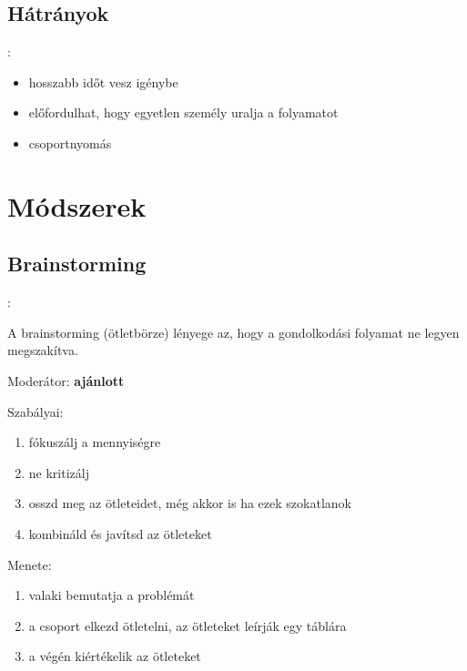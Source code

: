 \documentclass{beamer}
\begin{document}
\subsection{Hátrányok}
\begin{frame}{\secname : \subsecname}
    \begin{itemize}
        \item hosszabb időt vesz igénybe
        \item előfordulhat, hogy egyetlen személy uralja a folyamatot
        \item csoportnyomás
    \end{itemize}
\end{frame}


\section{Módszerek}

\subsection{Brainstorming}
\begin{frame}{\secname : \subsecname}

A brainstorming (ötletbörze) lényege az, hogy a gondolkodási folyamat ne legyen megszakítva.

Moderátor: \textbf{ajánlott}

Szabályai:
\begin{enumerate}
    \item fókuszálj a mennyiségre
    \item ne kritizálj
    \item osszd meg az ötleteidet, még akkor is ha ezek szokatlanok
    \item kombináld és javítsd az ötleteket
\end{enumerate}

Menete:
\begin{enumerate}
    \item valaki bemutatja a problémát
    \item a csoport elkezd ötletelni, az ötleteket leírják egy táblára
    \item a végén kiértékelik az ötleteket
\end{enumerate}
\end{frame}
\end{document}
